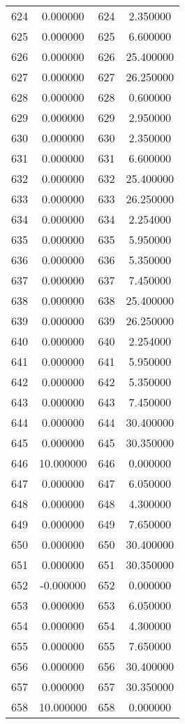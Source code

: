 \documentclass[12pt]{article}
\begin{document}
\begin{longtable}{@{}cccc@{}}
624 & 0.000000 & 624 & 2.350000 \\
625 & 0.000000 & 625 & 6.600000 \\
626 & 0.000000 & 626 & 25.400000 \\
627 & 0.000000 & 627 & 26.250000 \\
628 & 0.000000 & 628 & 0.600000 \\
629 & 0.000000 & 629 & 2.950000 \\
630 & 0.000000 & 630 & 2.350000 \\
631 & 0.000000 & 631 & 6.600000 \\
632 & 0.000000 & 632 & 25.400000 \\
633 & 0.000000 & 633 & 26.250000 \\
634 & 0.000000 & 634 & 2.254000 \\
635 & 0.000000 & 635 & 5.950000 \\
636 & 0.000000 & 636 & 5.350000 \\
637 & 0.000000 & 637 & 7.450000 \\
638 & 0.000000 & 638 & 25.400000 \\
639 & 0.000000 & 639 & 26.250000 \\
640 & 0.000000 & 640 & 2.254000 \\
641 & 0.000000 & 641 & 5.950000 \\
642 & 0.000000 & 642 & 5.350000 \\
643 & 0.000000 & 643 & 7.450000 \\
644 & 0.000000 & 644 & 30.400000 \\
645 & 0.000000 & 645 & 30.350000 \\
646 & 10.000000 & 646 & 0.000000 \\
647 & 0.000000 & 647 & 6.050000 \\
648 & 0.000000 & 648 & 4.300000 \\
649 & 0.000000 & 649 & 7.650000 \\
650 & 0.000000 & 650 & 30.400000 \\
651 & 0.000000 & 651 & 30.350000 \\
652 & -0.000000 & 652 & 0.000000 \\
653 & 0.000000 & 653 & 6.050000 \\
654 & 0.000000 & 654 & 4.300000 \\
655 & 0.000000 & 655 & 7.650000 \\
656 & 0.000000 & 656 & 30.400000 \\
657 & 0.000000 & 657 & 30.350000 \\
658 & 10.000000 & 658 & 0.000000 \\

\end{longtable}
\end{document}
